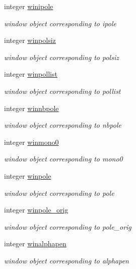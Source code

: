 \begin{DoxyCompactItemize}
integer \hyperlink{classmpole_a0603a7e979963e0aa76806b59dc99034}{winipole}
\begin{DoxyCompactList}\small\item\em window object corresponding to ipole \end{DoxyCompactList}\item 
integer \hyperlink{classmpole_a5c13bec4bb98474b3cd944ae2ee6c7db}{winpolsiz}
\begin{DoxyCompactList}\small\item\em window object corresponding to polsiz \end{DoxyCompactList}\item 
integer \hyperlink{classmpole_a81b851a05f8ad3f4bc977aa67ef5fdb9}{winpollist}
\begin{DoxyCompactList}\small\item\em window object corresponding to pollist \end{DoxyCompactList}\item 
integer \hyperlink{classmpole_acf42619768b96f86ff59c29e25bce1f3}{winnbpole}
\begin{DoxyCompactList}\small\item\em window object corresponding to nbpole \end{DoxyCompactList}\item 
integer \hyperlink{classmpole_ad85303f58e12c2fccac8d9f029e0425b}{winmono0}
\begin{DoxyCompactList}\small\item\em window object corresponding to mono0 \end{DoxyCompactList}\item 
integer \hyperlink{classmpole_a83c9e5735e6ad5cdc89a646eeec3e672}{winpole}
\begin{DoxyCompactList}\small\item\em window object corresponding to pole \end{DoxyCompactList}\item 
integer \hyperlink{classmpole_a3242ee253cbec968b60c695113094204}{winpole\-\_\-orig}
\begin{DoxyCompactList}\small\item\em window object corresponding to pole\-\_\-orig \end{DoxyCompactList}\item 
integer \hyperlink{classmpole_a691729318941f457d1a53afec3ed5e1a}{winalphapen}
\begin{DoxyCompactList}\small\item\em window object corresponding to alphapen \end{DoxyCompactList}\item 

\end{DoxyCompactItemize}
